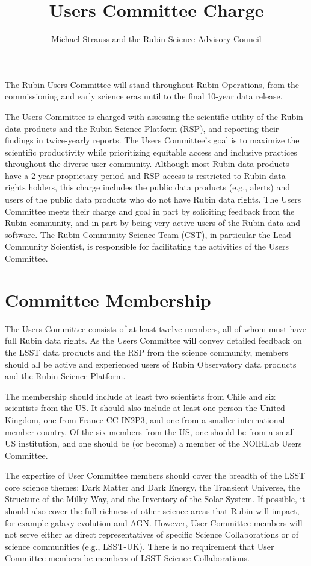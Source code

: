 \documentclass[OPS,toc]{lsstdoc}
\title{Users Committee Charge}
\author{%
Michael Strauss and the Rubin Science Advisory Council
}
\date{\vcsDate}
\begin{document}
\maketitle

The Rubin Users Committee will stand throughout Rubin Operations, from the commissioning and early science eras until to the final 10-year data release.

The Users Committee is charged with assessing the scientific utility of the Rubin data products and the Rubin Science Platform (RSP), and reporting their findings in twice-yearly reports.
The Users Committee's goal is to maximize the scientific productivity while prioritizing equitable access and inclusive practices throughout the diverse user community.
Although most Rubin data products have a 2-year proprietary period and RSP access is restricted to Rubin data rights holders, this charge includes the public data products (e.g., alerts) and users of the public data products who do not have Rubin data rights.
The Users Committee meets their charge and goal in part by soliciting feedback from the Rubin community, and in part by being very active users of the Rubin data and software.
The Rubin Community Science Team (CST), in particular the Lead Community Scientist, is responsible for facilitating the activities of the Users Committee.

\section{Committee Membership}

The Users Committee consists of at least twelve members, all of whom must have full Rubin data rights.
As the Users Committee will convey detailed feedback on the LSST data products and the RSP from the science community, members should all be active and experienced users of Rubin Observatory data products and the Rubin Science Platform.

The membership should include at least two scientists from Chile and six scientists from the US.
It should also include at least one person the United Kingdom, one from France CC-IN2P3, and one from a smaller international member country.
Of the six members from the US, one should be from a small US institution, and one should be (or become) a member of the NOIRLab Users Committee.

The expertise of User Committee members should cover the breadth of the LSST core science themes: Dark Matter and Dark Energy, the Transient Universe, the Structure of the Milky Way, and the Inventory of the Solar System.
If possible, it should also cover the full richness of other science areas that Rubin will impact, for example galaxy evolution and AGN.
However, User Committee members will not serve either as direct representatives of specific Science Collaborations or of science communities (e.g., LSST-UK).
There is no requirement that User Committee members be members of LSST Science Collaborations.
\end{document}
